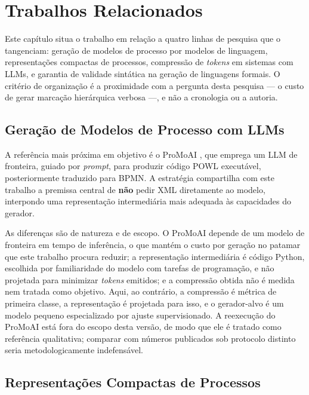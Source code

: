 
\chapter{Trabalhos Relacionados}
\label{cap:trabalhos-relacionados}

Este capítulo situa o trabalho em relação a quatro linhas de pesquisa que o tangenciam: geração de modelos de processo por modelos de linguagem, representações compactas de processos, compressão de \textit{tokens} em sistemas com LLMs, e garantia de validade sintática na geração de linguagens formais. O critério de organização é a proximidade com a pergunta desta pesquisa — o custo de gerar marcação hierárquica verbosa —, e não a cronologia ou a autoria.

\section{Geração de Modelos de Processo com LLMs}
\label{sec:tr-geracao}

A referência mais próxima em objetivo é o ProMoAI \cite{kourani2024promoai}, que emprega um LLM de fronteira, guiado por \textit{prompt}, para produzir código POWL executável, posteriormente traduzido para BPMN. A estratégia compartilha com este trabalho a premissa central de \textbf{não} pedir XML diretamente ao modelo, interpondo uma representação intermediária mais adequada às capacidades do gerador.

As diferenças são de natureza e de escopo. O ProMoAI depende de um modelo de fronteira em tempo de inferência, o que mantém o custo por geração no patamar que este trabalho procura reduzir; a representação intermediária é código Python, escolhida por familiaridade do modelo com tarefas de programação, e não projetada para minimizar \textit{tokens} emitidos; e a compressão obtida não é medida nem tratada como objetivo. Aqui, ao contrário, a compressão é métrica de primeira classe, a representação é projetada para isso, e o gerador-alvo é um modelo pequeno especializado por ajuste supervisionado. A reexecução do ProMoAI está fora do escopo desta versão, de modo que ele é tratado como referência qualitativa; comparar com números publicados sob protocolo distinto seria metodologicamente indefensável.

\section{Representações Compactas de Processos}
\label{sec:tr-representacoes}

